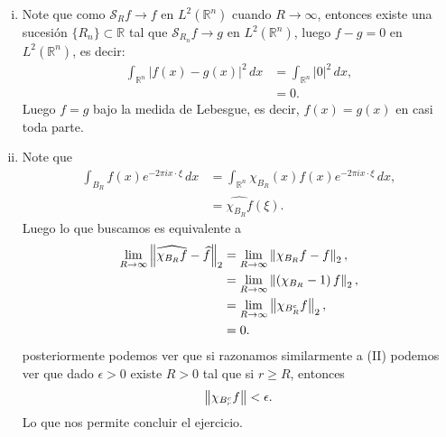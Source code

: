 \begin{homeworkProblem}
\begin{solution}
\begin{enumerate}[(i)]
      \item Note que como $\mathcal{S}_{R}f\to f$ en $L^2(\mathbb{R}^{n})$ cuando $R\to \infty$, entonces existe una sucesión $\{R_n\}\subset \mathbb{R}$ tal que $\mathcal{S}_{R_{n}}f\to g$ en $L^2(\mathbb{R}^{n})$, luego $f-g=0$ en $L^2(\mathbb{R}^{n})$, es decir:
        \begin{align*}
          \int_{\mathbb{R}^{n}}|f(x)-g(x)|^2\, dx&=\int_{\mathbb{R}^{n}}|0|^2\, dx,\\
          &=0.
        \end{align*}
      Luego $f=g$ bajo la medida de Lebesgue, es decir, $f(x)=g(x)$ en casi toda parte.
      \item Note que
        \begin{align*}
          \int_{B_{R}}f(x)e^{-2\pi ix\cdot \xi}\, dx&=\int_{\mathbb{R}^{n}}\chi_{B_{R}}(x)f(x)e^{-2\pi ix\cdot\xi}\, dx,\\
          &=\hat{\chi_{B_{R}}f}(\xi).
        \end{align*}
        Luego lo que buscamos es equivalente a
        \begin{align*}
          \lim_{R \to \infty}\left\|\widehat{\chi_{B_{R}}f}-\widehat{f}\right\|_{2}&=\lim_{R \to \infty}\left\|\chi_{B_{R}}f-f\right\|_2,\\
          &=\lim_{R \to \infty}\left\|\left( \chi_{B_{R}}-1 \right)f\right\|_{2},\\
          &=\lim_{R \to \infty}\left\|\chi_{B_{R}^{c}}f\right\|_{2},\\
          &=0.
        \end{align*}
        posteriormente podemos ver que si razonamos similarmente a (II) podemos ver que dado $\epsilon>0$ existe $R>0$ tal que si $r\geq R$, entonces
        \begin{align*}
          \left\|\chi_{B_{r}^{c}}f\right\|<\epsilon.
        \end{align*}
        Lo que nos permite concluir el ejercicio.
    \end{enumerate}    
  \end{solution}
\end{homeworkProblem}
